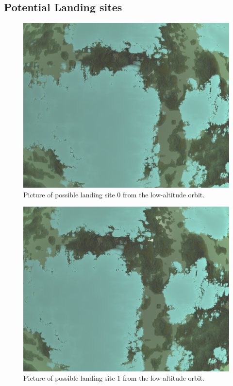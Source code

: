 \documentclass[reprint,english,notitlepage]{revtex4-2}
\begin{document}
\subsection{Potential Landing sites}\label{subsec:potential-landing-sites}
    \begin{figure}[h]
        \centering
        \includegraphics[scale=0.14]{Figures/l_site0}
        \caption{Picture of possible landing site 0 from the low-altitude orbit.}\label{fig:l_site0}
    \end{figure}
    \begin{figure}[h]
        \centering
        \includegraphics[scale=0.14]{Figures/l_site1}
        \caption{Picture of possible landing site 1 from the low-altitude orbit.}\label{fig:l_site1}
    \end{figure}
\end{document}
